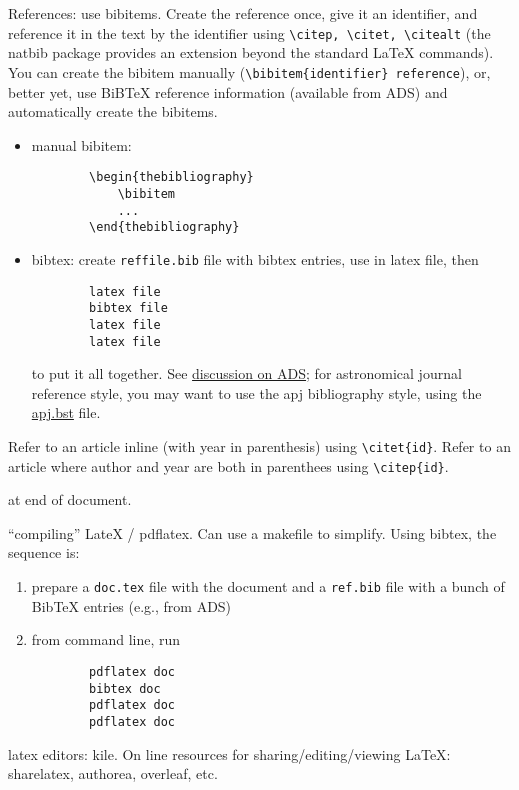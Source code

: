 \documentclass{article}
\begin{document}
References: use bibitems. Create the reference once, give it an
identifier, and reference it in the text by the identifier using
\verb|\citep, \citet, \citealt| (the natbib package provides an extension
beyond the standard LaTeX commands). You can create the bibitem
manually (\verb|\bibitem{identifier} reference|), or, better yet, use BiBTeX
reference information (available from ADS) and automatically create
the bibitems.
\begin{itemize}
    \item manual bibitem:
        \begin{verbatim}
        \begin{thebibliography}
            \bibitem
            ...
        \end{thebibliography}
        \end{verbatim}
    \item bibtex: create {\tt reffile.bib} file with bibtex entries, use
        \verb|| in latex file, then
        \begin{verbatim}
        latex file
        bibtex file
        latex file
        latex file
        \end{verbatim}
        to put it all together. See
        \href{http://ads.harvard.edu/pubs/bibtex/}{discussion on ADS};
        for astronomical journal reference style, you may want
        to use the apj bibliography style, using the
        \href{http://ads.harvard.edu/pubs/bibtex/astronat/apj/apj.bst}
        {apj.bst} file.
\end{itemize}

Refer to an article inline (with year in parenthesis) using
\verb|\citet{id}|.
Refer to an article where author and year are both in parenthees using
\verb|\citep{id}|.

\verb||  at end of document.

``compiling'' LateX / pdflatex. Can use a makefile to simplify. Using
bibtex, the sequence is:
\begin{enumerate}
    \item prepare a {\tt doc.tex} file with the document and a
        {\tt ref.bib} file with a bunch of BibTeX entries
        (e.g., from ADS)
    \item from command line, run
        \begin{verbatim}
        pdflatex doc
        bibtex doc
        pdflatex doc
        pdflatex doc
        \end{verbatim}
\end{enumerate}
latex editors: kile. On line resources for sharing/editing/viewing
LaTeX: sharelatex, authorea, overleaf, etc.
\end{document}
